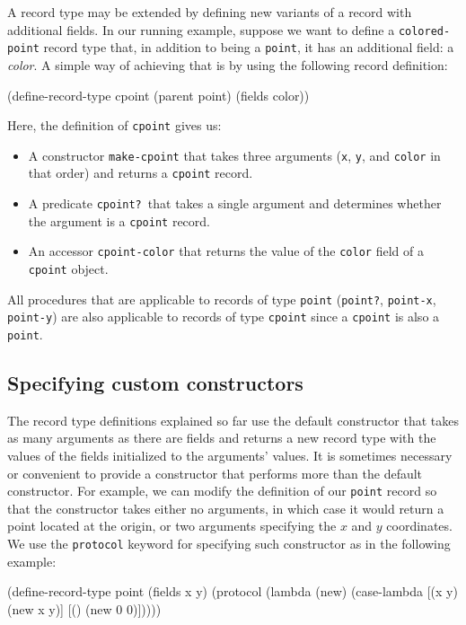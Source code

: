 \documentclass[onecolumn, 12pt, twoside, openright, dvipdfm]{book}
\begin{document}
A record type may be extended by defining new variants of a record
with additional fields.  In our running example, suppose we want
to define a \texttt{colored-point} record type that, in addition to
being a \texttt{point}, it has an additional field: a \emph{color}.
A simple way of achieving that is by using the following record 
definition:

\begin{CodeInline}
(define-record-type cpoint
  (parent point)
  (fields color))
\end{CodeInline}

Here, the definition of \texttt{cpoint} gives us:
\begin{itemize}
\item A constructor \texttt{make-cpoint} that takes three arguments
(\texttt{x}, \texttt{y}, and \texttt{color} in that order) and returns a
\texttt{cpoint} record.
\item A predicate \texttt{cpoint?}\ that takes a single argument and
determines whether the argument is a \texttt{cpoint} record.
\item An accessor \texttt{cpoint-color} that returns the value of
the \texttt{color} field of a \texttt{cpoint} object.
\end{itemize}

All procedures that are applicable to records of type
\texttt{point} (\texttt{point?}, \texttt{point-x},
\texttt{point-y}) are also applicable to records of type
\texttt{cpoint} since a \texttt{cpoint} is also a \texttt{point}.

\subsection{Specifying custom constructors}

The record type definitions explained so far use the default
constructor that takes as many arguments as there are fields and
returns a new record type with the values of the fields initialized
to the arguments' values.  It is sometimes necessary or convenient
to provide a constructor that performs more than the default
constructor.  For example, we can modify the definition of our
\texttt{point} record so that the constructor takes either
no arguments, in which case it would return a point located at the
origin, or two arguments specifying the $x$ and $y$ coordinates.  We
use the \texttt{protocol} keyword for specifying such constructor as
in the following example:

\begin{CodeInline}
(define-record-type point
  (fields x y)
  (protocol
    (lambda (new)
      (case-lambda
        [(x y) (new x y)]
        [()    (new 0 0)]))))
\end{CodeInline}
\end{document}

